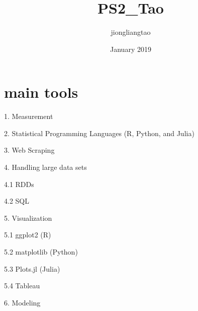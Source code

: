 \documentclass{article}
\title{PS2_Tao}
\author{jiongliangtao }
\date{January 2019}
\begin{document}
\maketitle

\section{main tools}

1. Measurement

2. Statistical Programming Languages (R, Python, and Julia)

3. Web Scraping

4. Handling large data sets

4.1 RDDs

4.2 SQL

5. Visualization

5.1 ggplot2 (R)

5.2 matplotlib (Python)

5.3 Plots.jl (Julia)

5.4 Tableau

6. Modeling
\end{document}
